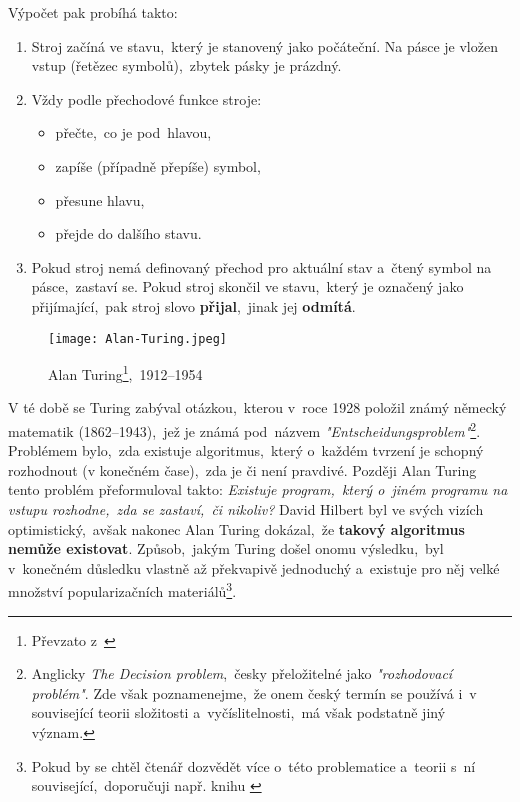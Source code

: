 Výpočet pak probíhá takto:
\begin{enumerate}
    \item Stroj začíná ve stavu,~který je stanovený jako počáteční. Na pásce je vložen vstup (řetězec symbolů),~zbytek pásky je prázdný.
    \item Vždy podle přechodové funkce stroje:
    \begin{itemize}
        \item přečte,~co je pod~hlavou,
        \item zapíše (případně přepíše) symbol,
        \item přesune hlavu,
        \item přejde do dalšího stavu.
    \end{itemize}
    \item Pokud stroj nemá definovaný přechod pro aktuální stav a~čtený symbol na pásce,~zastaví se. Pokud stroj skončil ve stavu,~který je označený jako přijímající,~pak stroj slovo \textbf{přijal},~jinak jej \textbf{odmítá}.
\end{enumerate}
\begin{figure}[h]
    \centering
    \texttt{[image: Alan-Turing.jpeg]}
    \caption[Alan Turing,~1871--1956]{Alan Turing\footnote{Převzato z~\cite{OConnorTuring2025}},~1912--1954}
    \label{fig:alan-turing}
\end{figure}
V té době se Turing zabýval otázkou,~kterou v~roce 1928 položil známý německý matematik  (1862--1943),~jež je známá pod~názvem \emph{"Entscheidungsproblem"}\footnote{Anglicky \emph{The Decision problem},~česky přeložitelné jako \emph{"rozhodovací problém"}. Zde však poznamenejme,~že onem český termín se používá i~v související teorii složitosti a~vyčíslitelnosti,~má však podstatně jiný význam.}. Problémem bylo,~zda existuje algoritmus,~který o~každém tvrzení je schopný rozhodnout (v konečném čase),~zda je či není pravdivé. Později Alan Turing tento problém přeformuloval takto: \emph{Existuje program,~který o~jiném programu na vstupu rozhodne,~zda se zastaví,~či nikoliv?} David Hilbert byl ve svých vizích optimistický,~avšak nakonec Alan Turing dokázal,~že \textbf{takový algoritmus nemůže existovat}. Způsob,~jakým Turing došel onomu výsledku,~byl v~konečném důsledku vlastně až překvapivě jednoduchý a~existuje pro něj velké množství popularizačních materiálů\footnote{Pokud by se chtěl čtenář dozvědět více o~této problematice a~teorii s~ní související,~doporučuji např. knihu \cite{Motwani2003}}.

